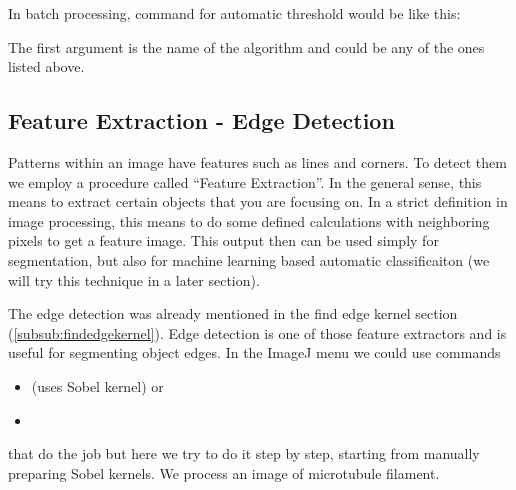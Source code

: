 In batch processing, command for automatic threshold would be like this:


The first argument is the name of the algorithm and could be any of the
ones listed above.
 
\subsection{Feature Extraction - Edge Detection}

Patterns within an image have features such as lines and corners. To detect them we employ a procedure called ``Feature Extraction''. In the general sense, this means to extract certain objects that you are focusing on. In a strict definition in image processing, this means to do some defined calculations with neighboring pixels to get a feature image. This output then can be used simply for segmentation, but also for machine learning based automatic classificaiton (we will try this technique in a later section). 

The edge detection was already mentioned in the find edge kernel section (\ref{subsub:findedgekernel}). Edge detection is one of those feature extractors and is useful for segmenting object edges. 
In the ImageJ menu we could use commands 
\begin{itemize}
\item {} (uses Sobel kernel) or 
\item {} 
\end{itemize}
that do the job but here we try to do it step by step, starting from manually preparing Sobel kernels. We process an image of microtubule filament. 


